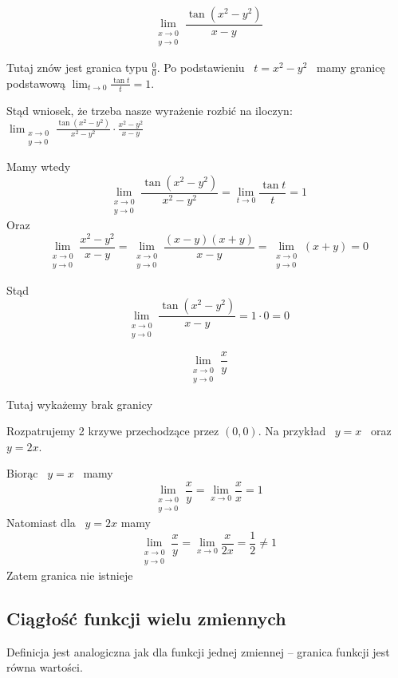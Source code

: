 \begin{przyklad}

$$ \lim_{\substack{x \to 0 \\ y \to 0}} \frac{\tan (x^2 - y^2)}{x - y} $$

Tutaj znów jest granica typu $ \frac{0}{0} $. Po podstawieniu \ $ t = x^2 - y^2 $ \ mamy granicę podstawową
$ \lim_{t \to 0} \frac{\tan t}{t} = 1 $.

Stąd wniosek, że trzeba nasze wyrażenie rozbić na iloczyn: 
$ \lim_{\substack{x \to 0 \\ y \to 0}} \frac{\tan (x^2 - y^2)}{x^2 - y^2} \cdot \frac{x^2 - y^2}{x - y} $

Mamy wtedy
$$ \lim_{\substack{x \to 0 \\ y \to 0}} \frac{\tan (x^2 - y^2)}{x^2 - y^2} = \lim_{t \to 0} \frac{\tan t}{t} = 1 $$
Oraz
$$ \lim_{\substack{x \to 0 \\ y \to 0}} \frac{x^2 - y^2}{x - y} = \lim_{\substack{x \to 0 \\ y \to 0}} \frac{(x - y)(x + y)}{x - y}
= \lim_{\substack{x \to 0 \\ y \to 0}} (x + y) = 0 $$

Stąd 
$$ \lim_{\substack{x \to 0 \\ y \to 0}} \frac{\tan (x^2 - y^2)}{x - y} = 1 \cdot 0 = 0 $$
\end{przyklad}

\begin{przyklad}

$$ \lim_{\substack{x \to 0 \\ y \to 0}} \frac{x}{y} $$

Tutaj wykażemy brak granicy

Rozpatrujemy 2 krzywe przechodzące przez $(0,0)$. Na przykład \ $ y = x $ \ oraz \ $ y = 2x $.

Biorąc \ $ y = x $ \ mamy
$$ \lim_{\substack{x \to 0 \\ y \to 0}} \frac{x}{y} = \lim_{x \to 0} \frac{x}{x} = 1 $$
Natomiast dla \ $ y = 2x $ mamy
$$ \lim_{\substack{x \to 0 \\ y \to 0}} \frac{x}{y} = \lim_{x \to 0} \frac{x}{2x} = \frac{1}{2} \neq 1 $$
Zatem granica nie istnieje
\end{przyklad}

\subsection{Ciągłość funkcji wielu zmiennych}

Definicja jest analogiczna jak dla funkcji jednej zmiennej -- granica funkcji jest równa wartości.


